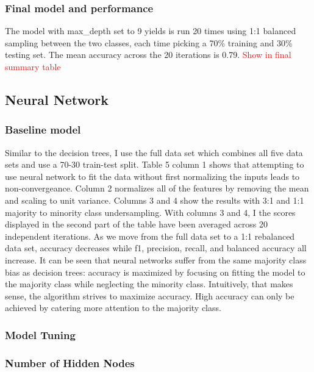 \documentclass{article}
\newcommand\todo[1]{\textcolor{red}{#1}}
\begin{document}
\subsubsection*{Final model and performance}

The model with max\_depth set to 9 yields is run 20 times using 1:1 balanced sampling between the two classes, each time picking a 70\% training and 30\% testing set. The mean accuracy across the 20 iterations is 0.79. \todo{Show in final summary table}

\subsection{Neural Network}

\subsubsection*{Baseline model}

Similar to the decision trees, I use the full data set which combines all five data sets and use a 70-30 train-test split. Table 5 column 1 shows that attempting to use neural network to fit the data without first normalizing the inputs leads to non-convergeance. Column 2 normalizes all of the features by removing the mean and scaling to unit variance. Columns 3 and 4 show the results with 3:1 and 1:1 majority to minority class undersampling. With columns 3 and 4, I the scores displayed in the second part of the table have been averaged across 20 independent iterations. As we move from the full data set to a 1:1 rebalanced data set, accuracy decreases while f1, precision, recall, and balanced accuracy all increase. It can be seen that neural networks suffer from the same majority class bias as decision trees: accuracy is maximized by focusing on fitting the model to the majority class while neglecting the minority class. Intuitively, that makes sense, the algorithm strives to maximize accuracy. High accuracy can only be achieved by catering more attention to the majority class. 

\subsubsection*{Model Tuning}
\subsubsection*{Number of Hidden Nodes}
\end{document}
